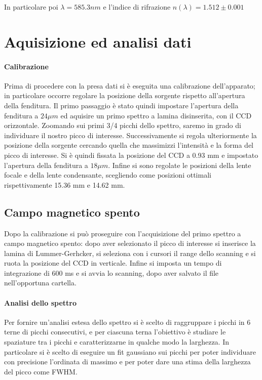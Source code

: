 \documentclass{article}
\begin{document}
In particolare poi $\lambda= 585.3 nm$ 
e l'indice di rifrazione $n(\lambda)= 1.512 \pm 0.001 $

\section*{Aquisizione ed analisi dati}
\paragraph{Calibrazione}
Prima di procedere con la presa dati si è eseguita una calibrazione 
dell'apparato; in particolare occorre regolare la posizione 
della sorgente rispetto all'apertura della fenditura.
Il primo passaggio è stato quindi impostare l'apertura della fenditura 
a $24 \mu m$ ed aquisire un primo spettro a lamina disinserita, con il 
CCD orizzontale. Zoomando sui primi 3/4 picchi dello spettro, saremo
in grado di individuare il nostro picco di interesse.
Successivamente si regola ulteriormente la posizione della sorgente 
cercando quella che massimizzi l'intensità e la forma del picco di 
interesse.
Si è quindi fissata la posizione del CCD a 0.93 mm e impostato l'apertura 
della fenditura a $18 \mu m$.
Infine si sono regolate le posizioni della lente focale e della lente 
condensante, scegliendo come posizioni ottimali rispettivamente 15.36 mm 
e 14.62 mm.


\subsection*{Campo magnetico spento}

Dopo la calibrazione si può proseguire con l'acquisizione del primo 
spettro a campo magnetico spento: dopo aver selezionato il picco di 
interesse si inserisce la lamina di Lummer-Gerhcker, si seleziona 
con i cursori il range dello scanning e si ruota la posizione del CCD
in verticale.
Infine si imposta un tempo di integrazione di 600 ms e si avvia lo 
scanning, dopo aver salvato il file nell'opportuna cartella.

\paragraph{Analisi dello spettro}

Per fornire un'analisi estesa dello spettro si è scelto di raggruppare
i picchi in 6 terne di picchi consecutivi, e per ciascuna terna
l'obiettivo è studiare le spaziature tra i picchi e caratterizzarne in
qualche modo la larghezza. 
In particolare si è scelto di eseguire un fit gaussiano sui picchi
per poter individuare con precisione l'ordinata di massimo e per
poter dare una stima della larghezza del picco come FWHM.
\end{document}
